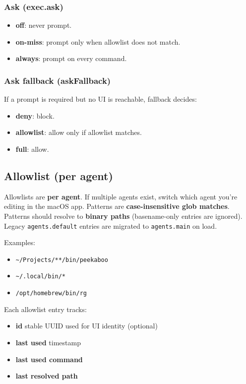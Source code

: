 \subsubsection{Ask (exec.ask)}


\begin{itemize}
  \item \textbf{off}: never prompt.
  \item \textbf{on-miss}: prompt only when allowlist does not match.
  \item \textbf{always}: prompt on every command.
\end{itemize}


\subsubsection{Ask fallback (askFallback)}


If a prompt is required but no UI is reachable, fallback decides:

\begin{itemize}
  \item \textbf{deny}: block.
  \item \textbf{allowlist}: allow only if allowlist matches.
  \item \textbf{full}: allow.
\end{itemize}


\subsection{Allowlist (per agent)}


Allowlists are \textbf{per agent}. If multiple agents exist, switch which agent you’re
editing in the macOS app. Patterns are \textbf{case-insensitive glob matches}.
Patterns should resolve to \textbf{binary paths} (basename-only entries are ignored).
Legacy \texttt{agents.default} entries are migrated to \texttt{agents.main} on load.

Examples:

\begin{itemize}
  \item \texttt{\textasciitilde{}/Projects/**/bin/peekaboo}
  \item \texttt{\textasciitilde{}/.local/bin/*}
  \item \texttt{/opt/homebrew/bin/rg}
\end{itemize}


Each allowlist entry tracks:

\begin{itemize}
  \item \textbf{id} stable UUID used for UI identity (optional)
  \item \textbf{last used} timestamp
  \item \textbf{last used command}
  \item \textbf{last resolved path}
\end{itemize}


